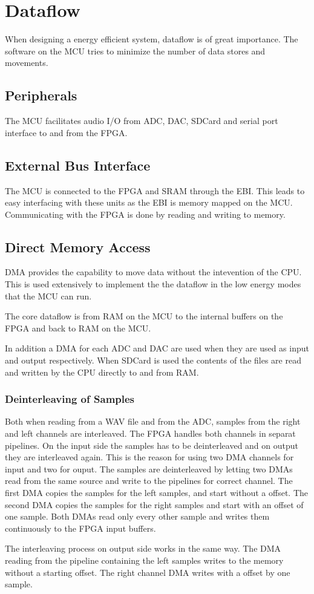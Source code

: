 \section{Dataflow}

When designing a energy efficient system, dataflow is of great importance. The software 
on the MCU tries to minimize the number of data stores and movements. 

\subsection{Peripherals}
The MCU facilitates audio I/O from ADC, DAC, SDCard and serial port interface to and from 
the FPGA. 


\subsection{External Bus Interface}
The MCU is connected to the FPGA and SRAM through the EBI. This leads to easy interfacing 
with these units as the EBI is memory mapped on the MCU. Communicating with the FPGA is 
done by reading and writing to memory. 


\subsection{Direct Memory Access}
DMA provides the capability to move data without the intevention of the CPU. 
This is used extensively to implement the the dataflow in the low energy modes
that the MCU can run.

The core dataflow is from RAM on the MCU to the internal buffers on the FPGA 
and back to RAM on the MCU. 

In addition a DMA for each ADC and DAC are used when they are used as input and 
output respectively. When SDCard is used the contents of the files are read and
written by the CPU directly to and from RAM. 

\subsubsection{Deinterleaving of Samples}

Both when reading from a WAV file and from the ADC, samples from the
right and left channels are interleaved. The FPGA handles both channels in separat
pipelines. On the input side the samples has to be deinterleaved and on output they
are interleaved again. This is the reason for using two DMA channels for input and 
two for ouput. 
The samples are deinterleaved by letting two DMAs read from the same source and write to 
the pipelines for correct channel. The first DMA copies the samples for the left samples,
and start without a offset. The second DMA copies the samples for the right samples and 
start with an offset of one sample. Both DMAs read only every other sample and writes them
continuously to the FPGA input buffers. 

The interleaving process on output side works in the same way. The DMA reading from the
pipeline containing the left samples writes to the memory without a starting offset.
The right channel DMA writes with a offset by one sample. 
